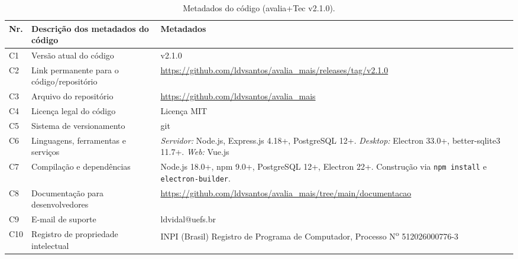 \documentclass[preprint,12pt,a4paper]{elsarticle}
\begin{document}
\begin{table}[!h]
\begin{tabular}{|l|p{6.5cm}|p{6.5cm}|}
\hline
\textbf{Nr.} & \textbf{Descrição dos metadados do código} & \textbf{Metadados} \\
\hline
C1 & Versão atual do código & v2.1.0 \\
\hline
C2 & Link permanente para o código/repositório & \url{https://github.com/ldvsantos/avalia_mais/releases/tag/v2.1.0} \\
\hline
C3 & Arquivo do repositório & \url{https://github.com/ldvsantos/avalia_mais} \\
\hline
C4 & Licença legal do código & Licença MIT \\
\hline
C5 & Sistema de versionamento & git \\
\hline
C6 & Linguagens, ferramentas e serviços & \textit{Servidor:} Node.js, Express.js 4.18+, PostgreSQL 12+. \textit{Desktop:} Electron 33.0+, better-sqlite3 11.7+. \textit{Web:} Vue.js \\
\hline
C7 & Compilação e dependências & Node.js 18.0+, npm 9.0+, PostgreSQL 12+, Electron 22+. Construção via \texttt{npm install} e \texttt{electron-builder}. \\
\hline
C8 & Documentação para desenvolvedores & \url{https://github.com/ldvsantos/avalia_mais/tree/main/documentacao} \\
\hline
C9 & E-mail de suporte & ldvidal@uefs.br \\
\hline
C10 & Registro de propriedade intelectual & INPI (Brasil) Registro de Programa de Computador, Processo N\textsuperscript{o} 512026000776-3 \\
\hline
\end{tabular}
\caption{Metadados do código (avalia+Tec v2.1.0).}
\label{codeMetadata}
\end{table}
\end{document}
